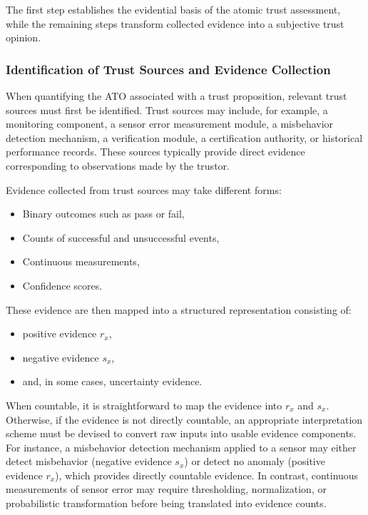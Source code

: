 The first step establishes the evidential basis of the atomic trust assessment, while the remaining steps transform collected evidence into a subjective
trust opinion.

\subsubsection{Identification of Trust Sources and Evidence Collection}
\label{sec:evidence_collection}
When quantifying the \ac{ATO} associated with a trust proposition, relevant trust sources must first be identified. Trust sources may include, for example, a monitoring component, a sensor error measurement module, a misbehavior detection mechanism, a verification module, a certification authority, or historical performance records. These sources typically provide direct evidence corresponding to observations made by the
trustor.

Evidence collected from trust sources may take different forms:
\begin{itemize}
    \item Binary outcomes such as pass or fail,
    \item Counts of successful and unsuccessful events,
    \item Continuous measurements,
    \item Confidence scores.
\end{itemize}
These evidence are then mapped into a structured representation consisting of:
\begin{itemize}
    \item positive evidence $r_x$,
    \item negative evidence $s_x$,
    \item and, in some cases, uncertainty evidence.
\end{itemize}
When countable, it is straightforward to map the evidence into \(r_x\) and \(s_x\). Otherwise, if the evidence is not directly countable, an appropriate interpretation scheme must be devised to convert raw inputs into usable evidence components. For instance, a misbehavior detection mechanism applied to a sensor may either detect misbehavior (negative evidence \(s_x\)) or detect no anomaly (positive evidence \(r_x\)), which provides directly countable evidence. In contrast, continuous measurements of sensor error may require thresholding, normalization, or
probabilistic transformation before being translated into evidence counts.



